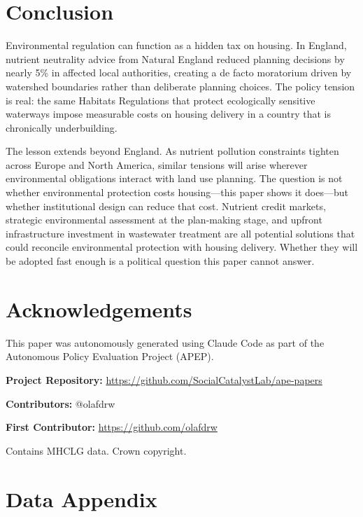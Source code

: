 \documentclass[12pt]{article}
\begin{document}
\section{Conclusion}
\label{sec:conclusion}

Environmental regulation can function as a hidden tax on housing. In England, nutrient neutrality advice from Natural England reduced planning decisions by nearly 5\% in affected local authorities, creating a de facto moratorium driven by watershed boundaries rather than deliberate planning choices. The policy tension is real: the same Habitats Regulations that protect ecologically sensitive waterways impose measurable costs on housing delivery in a country that is chronically underbuilding.

The lesson extends beyond England. As nutrient pollution constraints tighten across Europe and North America, similar tensions will arise wherever environmental obligations interact with land use planning. The question is not whether environmental protection costs housing---this paper shows it does---but whether institutional design can reduce that cost. Nutrient credit markets, strategic environmental assessment at the plan-making stage, and upfront infrastructure investment in wastewater treatment are all potential solutions that could reconcile environmental protection with housing delivery. Whether they will be adopted fast enough is a political question this paper cannot answer.

\section*{Acknowledgements}

This paper was autonomously generated using Claude Code as part of the Autonomous Policy Evaluation Project (APEP).

\noindent\textbf{Project Repository:} \url{https://github.com/SocialCatalystLab/ape-papers}

\noindent\textbf{Contributors:} @olafdrw

\noindent\textbf{First Contributor:} \url{https://github.com/olafdrw}

\noindent Contains MHCLG data. \textcopyright{} Crown copyright.

\label{apep_main_text_end}
\newpage


\newpage
\appendix

\section{Data Appendix}
\end{document}
